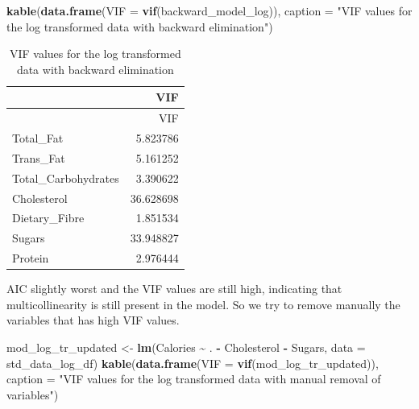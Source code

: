 \documentclass[
]{article}
\newenvironment{Shaded}{\begin{snugshade}}{\end{snugshade}}
\newcommand{\AttributeTok}[1]{\textcolor[rgb]{0.13,0.29,0.53}{#1}}
\newcommand{\FunctionTok}[1]{\textcolor[rgb]{0.13,0.29,0.53}{\textbf{#1}}}
\newcommand{\NormalTok}[1]{#1}
\newcommand{\OtherTok}[1]{\textcolor[rgb]{0.56,0.35,0.01}{#1}}
\newcommand{\SpecialCharTok}[1]{\textcolor[rgb]{0.81,0.36,0.00}{\textbf{#1}}}
\newcommand{\StringTok}[1]{\textcolor[rgb]{0.31,0.60,0.02}{#1}}
\begin{document}
\begin{Shaded}
\begin{Highlighting}[]
\FunctionTok{kable}\NormalTok{(}\FunctionTok{data.frame}\NormalTok{(}\AttributeTok{VIF =} \FunctionTok{vif}\NormalTok{(backward\_model\_log)),}
      \AttributeTok{caption =} \StringTok{"VIF values for the log transformed data with backward elimination"}\NormalTok{)}
\end{Highlighting}
\end{Shaded}

\begin{longtable}[]{@{}lr@{}}
\caption{VIF values for the log transformed data with backward
elimination}\tabularnewline
\toprule\noalign{}
& VIF \\
\midrule\noalign{}
\endfirsthead
\toprule\noalign{}
& VIF \\
\midrule\noalign{}
\endhead
\bottomrule\noalign{}
\endlastfoot
Total\_Fat & 5.823786 \\
Trans\_Fat & 5.161252 \\
Total\_Carbohydrates & 3.390622 \\
Cholesterol & 36.628698 \\
Dietary\_Fibre & 1.851534 \\
Sugars & 33.948827 \\
Protein & 2.976444 \\
\end{longtable}

AIC slightly worst and the VIF values are still high, indicating that
multicollinearity is still present in the model. So we try to remove
manually the variables that has high VIF values.

\begin{Shaded}
\begin{Highlighting}[]
\NormalTok{mod\_log\_tr\_updated }\OtherTok{\textless{}{-}} \FunctionTok{lm}\NormalTok{(Calories }\SpecialCharTok{\textasciitilde{}}\NormalTok{ . }\SpecialCharTok{{-}}\NormalTok{ Cholesterol }\SpecialCharTok{{-}}\NormalTok{ Sugars,}
                         \AttributeTok{data =}\NormalTok{ std\_data\_log\_df)}
\FunctionTok{kable}\NormalTok{(}\FunctionTok{data.frame}\NormalTok{(}\AttributeTok{VIF =} \FunctionTok{vif}\NormalTok{(mod\_log\_tr\_updated)),}
      \AttributeTok{caption =} \StringTok{"VIF values for the log transformed data with }
\StringTok{      manual removal of variables"}\NormalTok{)}
\end{Highlighting}
\end{Shaded}
\end{document}
